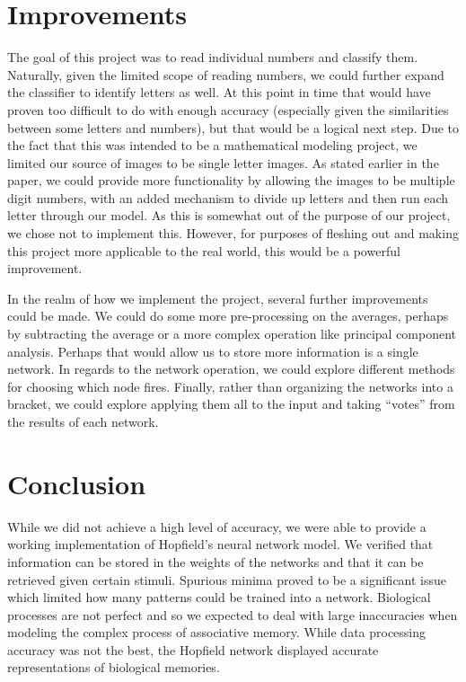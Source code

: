\documentclass[]{article}
\theoremstyle{plain}
\theoremstyle{definition}
\begin{document}
\section{Improvements}
The goal of this project was to read individual numbers and classify them.  Naturally, given the limited scope of reading numbers, we could further expand the classifier to identify letters as well.  At this point in time that would have proven too difficult to do with enough accuracy (especially given the similarities between some letters and numbers), but that would be a logical next step.  Due to the fact that this was intended to be a mathematical modeling project, we limited our source of images to be single letter images.  As stated earlier in the paper, we could provide more functionality by allowing the images to be multiple digit numbers, with an added mechanism to divide up letters and then run each letter through our model.  As this is somewhat out of the purpose of our project, we chose not to implement this.  However, for purposes of fleshing out and making this project more applicable to the real world, this would be a powerful improvement.

In the realm of how we implement the project, several further improvements could be made. We could do some more pre-processing on the averages, perhaps by subtracting the average or a more complex operation like principal component analysis. Perhaps that would allow us to store more information is a single network. In regards to the network operation, we could explore different methods for choosing which node fires. Finally, rather than organizing the networks into a bracket, we could explore applying them all to the input and taking ``votes'' from the results of each network. 

\section{Conclusion}

While we did not achieve a high level of accuracy, we were able to provide a working implementation of Hopfield's neural network model. We verified that information can be stored in the weights of the networks and that it can be retrieved given certain stimuli. Spurious minima proved to be a significant issue which limited how many patterns could be trained into a network. Biological processes are not perfect and so we expected to deal with large inaccuracies when modeling the complex process of associative memory. While data processing accuracy was not the best, the Hopfield network displayed accurate representations of biological memories.
\end{document}
